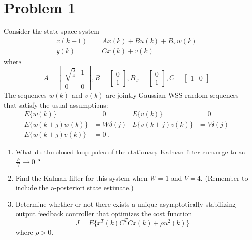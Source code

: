 \section*{Problem 1}

Consider the state-space system
\begin{align*}
x(k+1) & = A x(k) + B u(k) + B_w w(k) \\
y(k)   & = C x(k) + v(k)
\end{align*}
where
\begin{equation*}
A = \begin{bmatrix}
    \sqrt{\frac{3}{4}} & 1 \\
    0 & 0
\end{bmatrix},
B = \begin{bmatrix}
    0 \\
    1
\end{bmatrix},
B_w = \begin{bmatrix}
    0 \\
    1
\end{bmatrix},
C = \begin{bmatrix}
    1 & 0
\end{bmatrix}
\end{equation*}
The sequences $w(k)$ and $v(k)$ are jointly Gaussian WSS
random sequences that satisfy the usual assumptions:
\begin{align*}
    E \{ w(k) \} & = 0
        & E \{ v(k) \} & = 0 \\
    E \{ w(k+j) w(k) \} & = W \delta(j)
        & E \{ v(k+j) v(k) \} & = V \delta(j) \\
    E \{ w(k+j) v(k) \} & = 0 \; .
\end{align*}

\begin{enumerate}
\item What do the closed-loop poles of the stationary Kalman
filter converge to as $\frac{W}{V} \rightarrow 0$ ?
\item Find the Kalman filter for this system when $W = 1$ and $V = 4$.
(Remember to include the a-posteriori state estimate.)
\item Determine whether or not there exists a unique asymptotically
stabilizing output feedback controller that optimizes the cost function
\begin{equation*}
J = E\{x^T(k) C^T C x(k) + \rho u^2(k)\}
\end{equation*}
where $\rho > 0$.
\end{enumerate}
